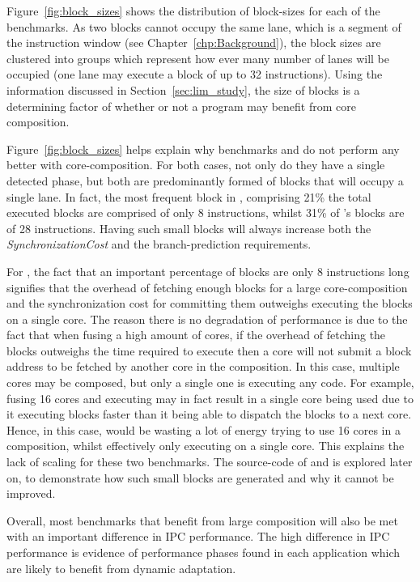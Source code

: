 Figure~\ref{fig:block_sizes} shows the distribution of block-sizes for each of the benchmarks.
As two blocks cannot occupy the same lane, which is a segment of the instruction window (see Chapter~\ref{chp:Background}), the block sizes are clustered into groups which represent how ever many number of lanes will be occupied (one lane may execute a block of up to 32 instructions).
Using the information discussed in Section~\ref{sec:lim_study}, the size of blocks is a determining factor of whether or not a program may benefit from core composition.

Figure~\ref{fig:block_sizes} helps explain why benchmarks  and  do not perform any better with core-composition.
For both cases, not only do they have a single detected phase, but both are predominantly formed of blocks that will occupy a single lane.
In fact, the most frequent block in , comprising 21\% the total executed blocks are comprised of only 8 instructions, whilst 31\% of 's blocks are of 28 instructions.
Having such small blocks will always increase both the \textit{SynchronizationCost} and the branch-prediction requirements.

For , the fact that an important percentage of blocks are only 8 instructions long signifies that the overhead of fetching enough blocks for a large core-composition and the synchronization cost for committing them outweighs executing the blocks on a single core.
The reason there is no degradation of performance is due to the fact that when fusing a high amount of cores, if the overhead of fetching the blocks outweighs the time required to execute then a core will not submit a block address to be fetched by another core in the composition.
In this case, multiple cores may be composed, but only a single one is executing any code.
For example, fusing 16 cores and executing  may in fact result in a single core being used due to it executing blocks faster than it being able to dispatch the blocks to a next core.
Hence, in this case,  would be wasting a lot of energy trying to use 16 cores in a composition, whilst effectively only executing on a single core. 
This explains the lack of scaling for these two benchmarks.
The source-code of  and  is explored later on, to demonstrate how such small blocks are generated and why it cannot be improved.

Overall, most benchmarks that benefit from large composition will also be met with an important difference in IPC performance.
The high difference in IPC performance is evidence of performance phases found in each application which are likely to benefit from dynamic adaptation.

